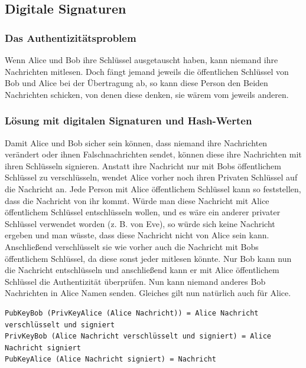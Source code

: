 \clearpage

\subsection{Digitale Signaturen}

\subsubsection{Das Authentizitätsproblem}

Wenn Alice und Bob ihre Schlüssel ausgetauscht haben, kann niemand ihre Nachrichten mitlesen.
Doch fängt jemand jeweils die öffentlichen Schlüssel von Bob und Alice bei der Übertragung ab,
so kann diese Person den Beiden Nachrichten schicken, von denen diese denken, sie wärem vom
jeweils anderen.

\subsubsection{Lösung mit digitalen Signaturen und Hash-Werten}

Damit Alice und Bob sicher sein können, dass niemand ihre Nachrichten verändert oder
ihnen Falschnachrichten sendet, können diese ihre Nachrichten mit ihren Schlüsseln signieren.
Anstatt ihre Nachricht nur mit Bobs öffentlichem Schlüssel zu verschlüsseln, wendet Alice vorher noch
ihren Privaten Schlüssel auf die Nachricht an. Jede Person mit Alice öffentlichem Schlüssel
kann so feststellen, dass die Nachricht von ihr kommt. Würde man diese Nachricht mit Alice
öffentlichem Schlüssel entschlüsseln wollen, und es wäre ein anderer privater Schlüssel
verwendet worden (z. B. von Eve), so würde sich keine Nachricht ergeben und man wüsste,
dass diese Nachricht nicht von Alice sein kann. Anschließend verschlüsselt sie wie vorher
auch die Nachricht mit Bobs öffentlichem Schlüssel, da diese sonst jeder mitlesen könnte.
Nur Bob kann nun die Nachricht entschlüsseln und anschließend kann er mit Alice öffentlichem
Schlüssel die Authentizität überprüfen. Nun kann niemand anderes Bob Nachrichten in Alice Namen
senden. Gleiches gilt nun natürlich auch für Alice.

\begin{lstlisting}[basicstyle=\small]
PubKeyBob (PrivKeyAlice (Alice Nachricht)) = Alice Nachricht verschlüsselt und signiert
PrivKeyBob (Alice Nachricht verschlüsselt und signiert) = Alice Nachricht signiert
PubKeyAlice (Alice Nachricht signiert) = Nachricht
\end{lstlisting}

